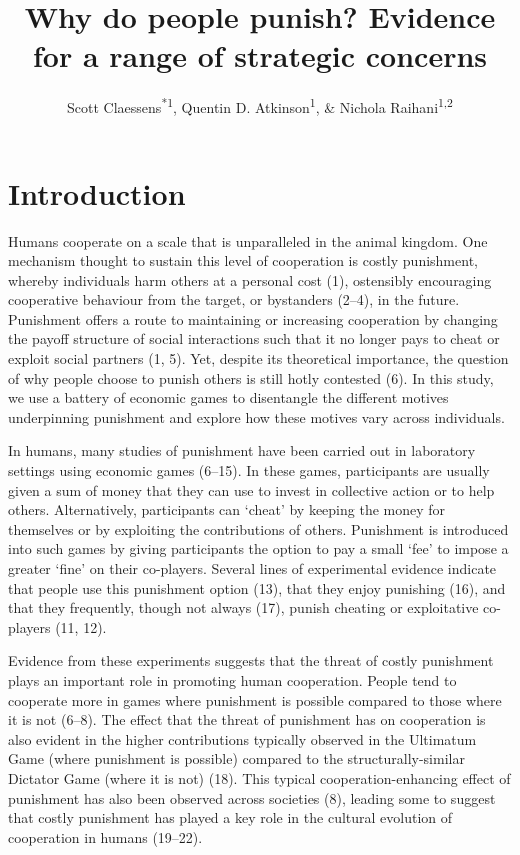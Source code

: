 \documentclass[
  english,
  man, donotrepeattitle,floatsintext]{apa6}
\title{Why do people punish? Evidence for a range of strategic concerns}
\author{Scott Claessens\textsuperscript{*1}, Quentin D. Atkinson\textsuperscript{1}, \& Nichola Raihani\textsuperscript{1,2}}
\date{}
\affiliation{\vspace{0.5cm}\textsuperscript{1} \footnotesize School of Psychology, University of Auckland, Auckland, New Zealand\\\textsuperscript{2} \footnotesize Department of Experimental Psychology, University College London, London, United Kingdom}
\begin{document}
\maketitle

\linenumbers

\hypertarget{introduction}{%
\section{Introduction}\label{introduction}}

Humans cooperate on a scale that is unparalleled in the animal kingdom. One
mechanism thought to sustain this level of cooperation is costly punishment,
whereby individuals harm others at a personal cost (1),
ostensibly encouraging cooperative behaviour from the target, or bystanders
(2--4), in the future. Punishment offers a
route to maintaining or increasing cooperation by changing the payoff structure
of social interactions such that it no longer pays to cheat or exploit social
partners (1, 5). Yet, despite its theoretical
importance, the question of why people choose to punish others is still hotly
contested (6). In this study, we use a battery of economic games to
disentangle the different motives underpinning punishment and explore how these
motives vary across individuals.

In humans, many studies of punishment have been carried out in laboratory
settings using economic games (6--15). In these games, participants are usually given a sum of money
that they can use to invest in collective action or to help others.
Alternatively, participants can `cheat' by keeping the money for themselves or
by exploiting the contributions of others. Punishment is introduced into such
games by giving participants the option to pay a small `fee' to impose a greater
`fine' on their co-players. Several lines of experimental evidence indicate that
people use this punishment option (13), that they enjoy
punishing (16), and that they frequently, though not
always (17), punish cheating or exploitative
co-players (11, 12).

Evidence from these experiments suggests that the threat of costly punishment
plays an important role in promoting human cooperation. People tend to cooperate
more in games where punishment is possible compared to those where it is not
(6--8). The effect that the threat of
punishment has on cooperation is also evident in the higher contributions
typically observed in the Ultimatum Game (where punishment is possible) compared
to the structurally-similar Dictator Game (where it is not) (18). This
typical cooperation-enhancing effect of punishment has also been observed across
societies (8), leading some to suggest that costly punishment has
played a key role in the cultural evolution of cooperation in humans
(19--22).
\end{document}
